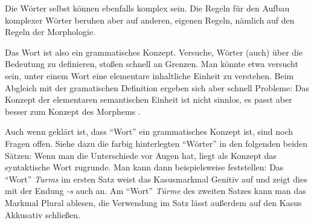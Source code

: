 
\noindent Die Wörter selbst können ebenfalls komplex sein. Die Regeln für den Aufbau komplexer Wörter beruhen aber auf anderen, eigenen Regeln, nämlich auf den Regeln der Morphologie.

Das Wort ist also ein grammatisches Konzept. Versuche, Wörter (auch) über die Bedeutung zu definieren, stoßen schnell an Grenzen. Man könnte etwa versucht sein, unter einem Wort eine elementare inhaltliche Einheit zu verstehen. Beim Abgleich mit der gramatischen Definition ergeben sich aber schnell Probleme:
Das Konzept der elementaren semantischen Einheit ist nicht sinnlos, es passt aber besser zum Konzept des Morphems .

Auch wenn geklärt ist, dass \enquote{Wort} ein grammatisches Konzept ist, sind noch Fragen offen. Siehe dazu die farbig hinterlegten \enquote{Wörter} in den folgenden beiden Sätzen:
Wenn man die Unterschiede vor Augen hat, liegt als Konzept das syntaktische Wort zugrunde. Man kann dann beispielsweise feststellen: Das \enquote{Wort} \textit{Turms} im ersten Satz weist das Kasusmarkmal Genitiv auf und zeigt dies mit der Endung \textit{-s} auch an. Am \enquote{Wort} \textit{Türme} des zweiten Satzes kann man das Markmal Plural ablesen, die Verwendung im Satz lässt außerdem auf den Kasus Akkusativ schließen.
